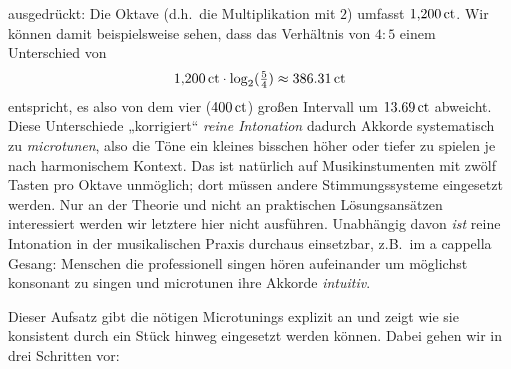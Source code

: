 \documentclass[ngerman,11pt]{scrartcl}
\begin{document}
ausgedrückt: Die Oktave (d.h.\ die Multiplikation mit $2$) umfasst
$1{,}200\,\mathrm{ct}$. Wir können damit beispielsweise sehen, dass das Verhältnis
von $4:5$ einem Unterschied von
\[1{,}200\,\mathrm{ct}\cdot \log_2(\tfrac54) \approx 386.31\,\mathrm{ct}\]%
entspricht, es also von dem vier  ($400\,\mathrm{ct}$) großen Intervall um
$13.69\,\mathrm{ct}$ abweicht. Diese Unterschiede „korrigiert“
\emph{reine Intonation} dadurch Akkorde systematisch zu \emph{microtunen}, also
die Töne ein kleines bisschen höher oder tiefer zu spielen je nach harmonischem
Kontext. Das ist natürlich auf Musikinstumenten mit zwölf Tasten pro Oktave
unmöglich; dort müssen andere Stimmungssysteme eingesetzt werden. Nur an der
Theorie und nicht an praktischen Lösungsansätzen interessiert werden wir
letztere hier nicht ausführen. Unabhängig davon \emph{ist} reine Intonation in
der musikalischen Praxis durchaus einsetzbar, z.B.\ im a cappella Gesang:
Menschen die professionell singen hören aufeinander um möglichst konsonant zu
singen und microtunen ihre Akkorde \emph{intuitiv}.

Dieser Aufsatz gibt die nötigen Microtunings explizit an und zeigt wie sie
konsistent durch ein Stück hinweg eingesetzt werden können. Dabei gehen wir in
drei Schritten vor:
\end{document}
